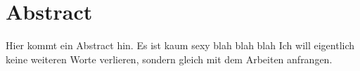 

\chapter*{Abstract}
\label{cha:abstract}


Hier kommt ein Abstract hin. Es ist kaum sexy blah blah blah
Ich will eigentlich keine weiteren Worte verlieren, sondern gleich mit dem Arbeiten anfrangen. 


